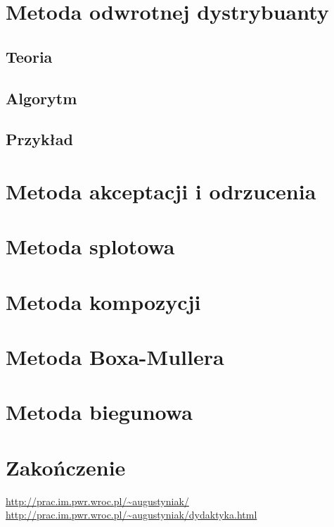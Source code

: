 \documentclass[12pt]{mwrep}
\begin{document}
	\section{Metoda odwrotnej dystrybuanty}
	\subsection{Teoria}
	\subsection{Algorytm}
	\subsection{Przykład}
	
	\section{Metoda akceptacji i odrzucenia}
	
	\section{Metoda splotowa}
	
	\section{Metoda kompozycji}
	
	\section{Metoda Boxa-Mullera}
	
	\section{Metoda biegunowa}
	
	\section{Zakończenie}
	
	
	\begin{thebibliography}{1}%
		\url{http://prac.im.pwr.wroc.pl/~augustyniak/}
		\url{http://prac.im.pwr.wroc.pl/~augustyniak/dydaktyka.html}
	\end{thebibliography}
	
\end{document}
